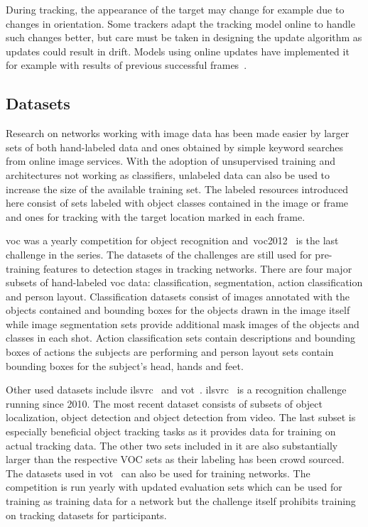 During tracking, the appearance of the target may change for example due to changes in orientation. Some trackers adapt the tracking model online to handle such changes better, but care must be taken in designing the update algorithm as updates could result in drift. Models using online updates have implemented it for example with results of previous successful frames~\cite{BLUR_TRACK}.

\subsection{Datasets}
Research on networks working with image data has been made easier by larger sets of both hand-labeled data and ones obtained by simple keyword searches from online image services. With the adoption of unsupervised training and architectures not working as classifiers, unlabeled data can also be used to increase the size of the available training set. The labeled resources introduced here consist of sets labeled with object classes contained in the image or frame and ones for tracking with the target location marked in each frame.

\ac{voc} was a yearly competition for object recognition and~\ac{voc}2012~\cite{VOC12} is the last challenge in the series. The datasets of the challenges are still used for pre-training features to detection stages in tracking networks. There are four major subsets of hand-labeled \ac{voc} data: classification, segmentation, action classification and person layout. Classification datasets consist of images annotated with the objects contained and bounding boxes for the objects drawn in the image itself while image segmentation sets provide additional mask images of the objects and classes in each shot. Action classification sets contain descriptions and bounding boxes of actions the subjects are performing and person layout sets contain bounding boxes for the subject's head, hands and feet.

Other used datasets include \ac{ilsvrc}~\cite{ILSVRC15} and \ac{vot}~\cite{VOT}. \ac{ilsvrc}~\cite{ILSVRC15} is a recognition challenge running since 2010. The most recent dataset consists of subsets of object localization, object detection and object detection from video. The last subset is especially beneficial object tracking tasks as it provides data for training on actual tracking data. The other two sets included in it are also substantially larger than the respective VOC sets as their labeling has been crowd sourced. The datasets used in \ac{vot}~\cite{VOT} can also be used for training networks. The competition is run yearly with updated evaluation sets which can be used for training as training data for a network but the challenge itself prohibits training on tracking datasets for participants.

